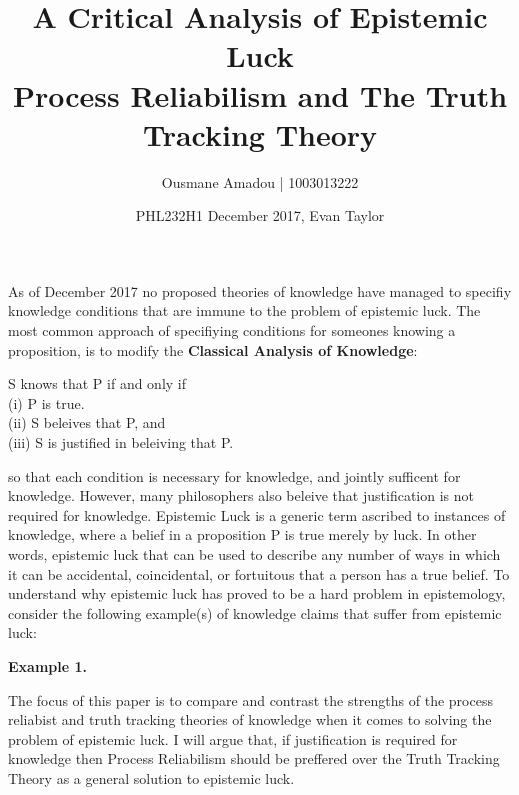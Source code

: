 \documentclass{article}
\title{%
  A Critical Analysis of Epistemic Luck \\
  \large Process Reliabilism and The Truth Tracking Theory }
\author{Ousmane Amadou | 1003013222}
\date{PHL232H1 December 2017, Evan Taylor}
\begin{document}
\maketitle

As of December 2017 no proposed theories of knowledge have managed
to specifiy knowledge conditions that are immune to the problem of
epistemic luck. %
The most common approach of specifiying conditions for someones knowing
a proposition, is to modify the \textbf{Classical Analysis of Knowledge}:
\begin{displayquote} %
   S knows that P if and only if \\
  (i) P is true. \\
  (ii) S beleives that P, and \\
  (iii) S is justified in beleiving that P.
\end{displayquote} so that each condition is necessary for knowledge, and jointly
sufficent for knowledge. However, many philosophers also beleive that justification
is not required for knowledge. Epistemic Luck is a generic term ascribed to instances of
knowledge, where a belief in a proposition P is true merely by luck. In other words,
epistemic luck that can be used to describe any number of ways in which it can be
accidental, coincidental, or fortuitous that a person has a true belief. To understand why epistemic luck has
proved to be a hard problem in epistemology, consider the following example(s) of knowledge claims
that suffer from epistemic luck:

\begin{displayquote}
\textbf{Example 1.}
\end{displayquote}
The focus of this paper is to compare and contrast the strengths of the process reliabist and
truth tracking theories of knowledge when it comes to solving the problem
of epistemic luck. I will argue that, if justification is required for
knowledge then Process Reliabilism should be preffered over the Truth Tracking
Theory as a general solution to epistemic luck.
\end{document}
